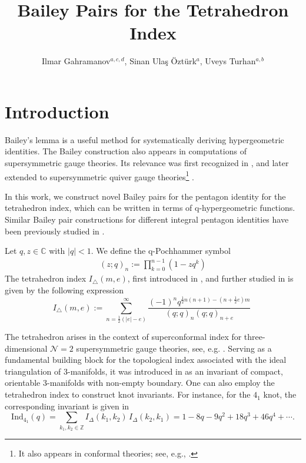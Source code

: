 \documentclass[11pt,a4paper]{article}
\title{Bailey Pairs for the Tetrahedron Index}
\author{Ilmar Gahramanov$^{a,c,d}$, Sinan Ulaş Öztürk$^{a}$, Uveys Turhan$^{a,b}$}
\affiliation{$^a$ Department of Physics, Bogazici University,\\ 34342 Bebek, Istanbul, Türkiye\\[-0.5cm]

$^b$ Department of Mathematics, Bogazici University,\\ 34342 Bebek, Istanbul, Türkiye\\[-0.5cm]
	
$^c$ Center for Mathematics and its Applications, Khazar University, \\ Mehseti St. 41, AZ1096, Baku, Azerbaijan\\[-0.5cm]

$^d$ Steklov Mathematical Institute of Russian Academy of Sciences, 119991 Moscow, Russia}
\begin{document}
	\maketitle
	\flushbottom
	
\section{Introduction}



Bailey's lemma is a useful method for systematically deriving hypergeometric identities. The Bailey construction also appears in computations of supersymmetric gauge theories. Its relevance was first recognized in \cite{Berkovich:1995xg,andrews1998trinomial}, and later extended to supersymmetric quiver gauge theories\footnote{It also appears in conformal theories; see, e.g., \cite{Foda:1994wz,Chim:1996rc,Berkovich:1996hb}.} \cite{Kashaev:2012cz,Gahramanov:2015cva,Brunner:2017lhb,Gahramanov:2021pgu,Gahramanov:2022jxz,Catak:2022glx,Akbulut:2025kow}. 

In this work, we construct novel Bailey pairs for the pentagon identity for the tetrahedron index, which can be written in terms of q-hypergeometric functions. Similar Bailey pair constructions for different integral pentagon identities have been previously studied in \cite{Gahramanov:2021pgu,Gahramanov:2022jxz}.

Let $q, z \in \mathbb{C}$ with $|q| < 1$. We define the q-Pochhammer symbol
\begin{gather}\label{q-poch}
    (z;q)_{n}:=\prod^{n-1}_{k=0}(1-zq^k)
\end{gather}
The tetrahedron index ${I_{\triangle}}(m,e)$, first introduced in \cite{ Dimofte:2011py}, and further studied in \cite{Garoufalidis2012The3I, GaroufalidisYu_2024_3DIndexSkein, GaroufalidisKashaev_2019_Meromorphic3DIndex} is given by the following expression
\begin{equation}\label{tetindex}
{I_{\triangle}}(m,e) :=\sum_{n=\frac{1}{2}(|e|-e)}^{\infty}\frac{(-1)^n q^{\frac12 n (n+1)-(n+\frac12 e)m}}{(q;q)_n (q; q)_{n+e}} \;
\end{equation}

The tetrahedron arises in the context of superconformal index for  three-dimensional $\mathcal N=2$ supersymmetric gauge theories, see, e.g. \cite{Gahramanov:2014ona}. Serving as a fundamental building block for the topological index associated with the ideal triangulation of $3$-manifolds, it was introduced in \cite{Dimofte:2011ju, Dimofte:2011py} as an invariant of compact, orientable $3$-manifolds with non-empty boundary. One can also employ the tetrahedron index to construct knot invariants. For instance, for the \( 4_1 \) knot, the corresponding invariant is given in \cite{Dimofte:2011py, Garoufalidis:2022mbi, Garoufalidis:2023wez}
\[
\text{Ind}_{4_1}(q) = \sum_{k_1, k_2 \in \mathbb{Z}} I_{\Delta}(k_1, k_2) \, I_{\Delta}(k_2, k_1)
= 1 - 8q - 9q^{2} + 18q^{3} + 46q^{4} + \cdots .
\]
\end{document}
